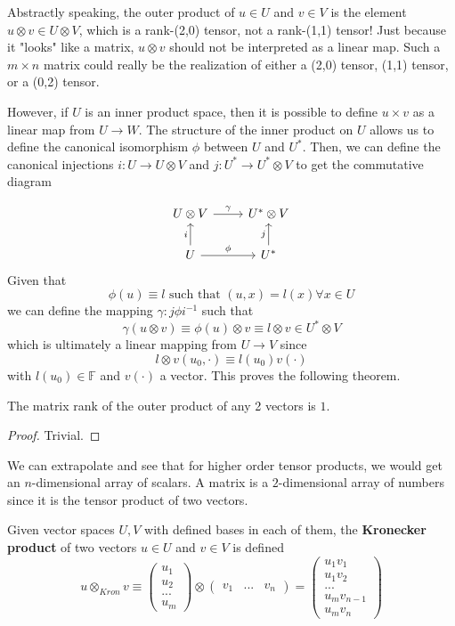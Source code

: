   Abstractly speaking, the outer product of $u \in U$ and $v \in V$ is the element $u \otimes v \in U \otimes V$, which is a rank-(2,0) tensor, not a rank-(1,1) tensor! Just because it "looks" like a matrix, $u \otimes v$ should not be interpreted as a linear map. Such a $m \times n$ matrix could really be the realization of either a (2,0) tensor, (1,1) tensor, or a (0,2) tensor. 

  However, if $U$ is an inner product space, then it is possible to define $u \times v$ as a linear map from $U \longrightarrow W$. The structure of the inner product on $U$ allows us to define the canonical isomorphism $\phi$ between $U$ and $U^*$. Then, we can define the canonical injections $i: U \longrightarrow U \otimes V$ and $j: U^* \longrightarrow U^* \otimes V$ to get the commutative diagram 

  \[\begin{tikzcd}
      U \otimes V \arrow{r}{\gamma} & U^* \otimes V \\
      U \arrow{u}{i} \arrow{r}{\phi} & U^* \arrow{u}{j}
  \end{tikzcd}\]
  Given that 
  \[\phi(u) \equiv l \text{ such that } (u, x) = l(x) \forall x \in U\]
  we can define the mapping $\gamma: j \phi i^{-1}$ such that 
  \[\gamma (u \otimes v) \equiv \phi(u) \otimes v \equiv l \otimes v \in U^* \otimes V\]
  which is ultimately a linear mapping from $U \longrightarrow V$ since
  \[l \otimes v (u_0, \cdot) \equiv l(u_0) v(\cdot)\]
  with $l(u_0) \in \mathbb{F}$ and $v(\cdot)$ a vector. This proves the following theorem. 

  \begin{proposition}
  The matrix rank of the outer product of any 2 vectors is $1$. 
  \end{proposition}
  \begin{proof}
  Trivial.
  \end{proof}

  We can extrapolate and see that for higher order tensor products, we would get an $n$-dimensional array of scalars. A matrix is a $2$-dimensional array of numbers since it is the tensor product of two vectors. 

  \begin{definition}
  Given vector spaces $U, V$ with defined bases in each of them, the \textbf{Kronecker product} of two vectors $u \in U$ and $v \in V$ is defined
  \[u \otimes_{Kron} v \equiv \begin{pmatrix}
  u_1 \\ u_2 \\ ... \\ u_m
  \end{pmatrix} \otimes \begin{pmatrix}
  v_1 & ... & v_n
  \end{pmatrix} = \begin{pmatrix}
  u_1 v_1 \\ u_1 v_2 \\ ... \\ u_m v_{n-1} \\ u_m v_n 
  \end{pmatrix}\]
  \end{definition}

